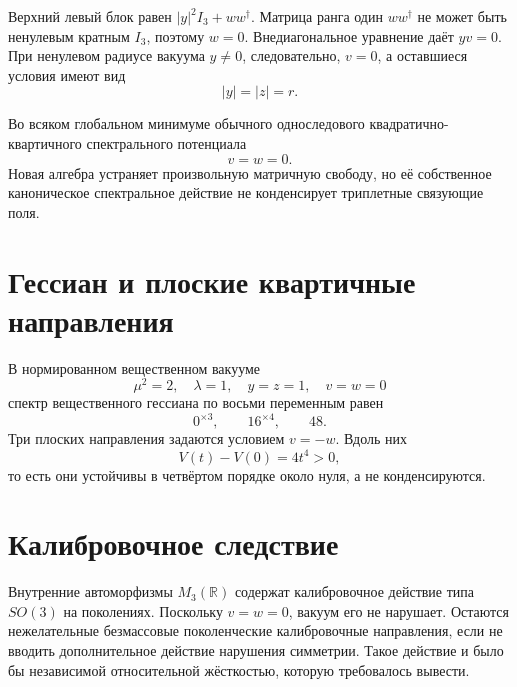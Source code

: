 Верхний левый блок равен \(|y|^2I_3+ww^\dagger\). Матрица ранга один
\(ww^\dagger\) не может быть ненулевым кратным \(I_3\), поэтому \(w=0\).
Внедиагональное уравнение даёт \(yv=0\). При ненулевом радиусе вакуума
\(y\ne0\), следовательно, \(v=0\), а оставшиеся условия имеют вид
\begin{equation}|y|=|z|=r.\end{equation}

\begin{theorem}
Во всяком глобальном минимуме обычного односледового квадратично-квартичного
спектрального потенциала
\begin{equation}v=w=0.\end{equation}
Новая алгебра устраняет произвольную матричную свободу, но её собственное
каноническое спектральное действие не конденсирует триплетные связующие поля.
\end{theorem}

\section{Гессиан и плоские квартичные направления}

В нормированном вещественном вакууме
\begin{equation}
 \mu^2=2,\quad\lambda=1,\quad y=z=1,\quad v=w=0
\end{equation}
спектр вещественного гессиана по восьми переменным равен
\begin{equation}0^{\times3},\qquad16^{\times4},\qquad48.\end{equation}
Три плоских направления задаются условием \(v=-w\). Вдоль них
\begin{equation}V(t)-V(0)=4t^4>0,\end{equation}
то есть они устойчивы в четвёртом порядке около нуля, а не конденсируются.

\section{Калибровочное следствие}

Внутренние автоморфизмы \(M_3(\mathbb R)\) содержат калибровочное действие
типа \(SO(3)\) на поколениях. Поскольку \(v=w=0\), вакуум его не нарушает.
Остаются нежелательные безмассовые поколенческие калибровочные направления,
если не вводить дополнительное действие нарушения симметрии. Такое действие
и было бы независимой относительной жёсткостью, которую требовалось вывести.

